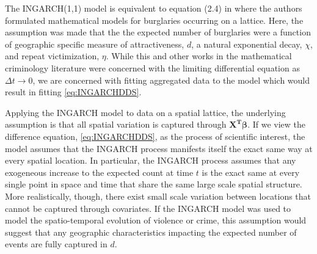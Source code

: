 \documentclass[11pt]{isuthesis}
\begin{document}
The INGARCH(1,1) model is equivalent to equation (2.4) in \cite{short2008statistical} where the authors formulated mathematical models for burglaries occurring on a lattice.  Here, the assumption was made that the the expected number of burglaries were a function of geographic specific measure of attractiveness, $d$, a natural exponential decay, $\chi$, and repeat victimization, $\eta$.  While this and other works in the mathematical criminology literature were concerned with the limiting differential equation as $\Delta t \to 0$, we are concerned with fitting aggregated data to the model which would result in fitting \eqref{eq:INGARCHDDS}.

Applying the INGARCH model to data on a spatial lattice, the underlying assumption is that all spatial variation is captured through $\boldsymbol{X^T}\boldsymbol{\beta}$. If we view the difference equation, \eqref{eq:INGARCHDDS}, as the process of scientific interest, the model assumes that the INGARCH process manifests itself the exact same way at every spatial location.  In particular, the INGARCH process assumes that any exogeneous increase to the expected count at time $t$ is the exact same at every single point in space and time that share the same large scale spatial structure.   More realistically, though, there exist small scale variation between locations that cannot be captured through covariates.  If the INGARCH model was used to model the spatio-temporal evolution of violence or crime, this assumption would suggest that any geographic characteristics impacting the expected number of events are fully captured in $d$.
\end{document}
